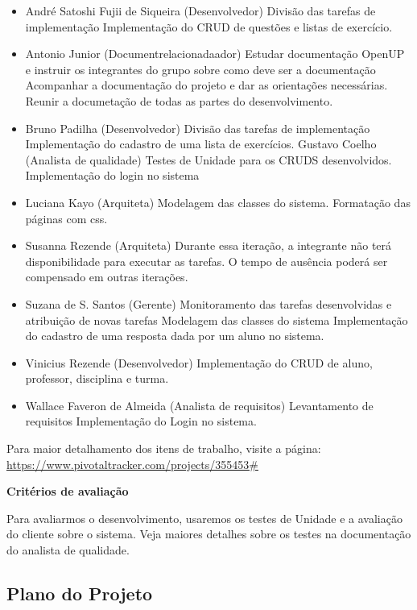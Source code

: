 \documentclass[12pt,letterpaper]{article}
\begin{document}
\begin{itemize}
\item {} André Satoshi Fujii de Siqueira (Desenvolvedor)
Divisão das tarefas de implementação
Implementação do CRUD de questões e listas de exercício.
\item {}Antonio Junior (Documentrelacionadaador)
Estudar documentação OpenUP e instruir os integrantes do grupo sobre como deve ser a documentação
Acompanhar a documentação do projeto e dar as orientações necessárias.
Reunir a documetação de todas as partes do desenvolvimento.
\item {}Bruno Padilha (Desenvolvedor)
Divisão das tarefas de implementação
Implementação do cadastro de uma lista de exercícios.
Gustavo Coelho (Analista de qualidade)
Testes de Unidade para os CRUDS desenvolvidos.
Implementação do login no sistema
\item {}Luciana Kayo (Arquiteta)
Modelagem das classes do sistema.
Formatação das páginas com css.
\item {}Susanna Rezende (Arquiteta)
Durante essa iteração, a integrante não terá disponibilidade para executar as tarefas.
O tempo de ausência poderá ser compensado em outras iterações.
\item {}Suzana de S. Santos (Gerente)
Monitoramento das tarefas desenvolvidas e atribuição de novas tarefas
Modelagem das classes do sistema
Implementação do cadastro de uma resposta dada por um aluno no sistema.
\item {}Vinicius Rezende (Desenvolvedor)
Implementação do CRUD de aluno, professor, disciplina e turma.
\item {}Wallace Faveron de Almeida (Analista de requisitos)
Levantamento de requisitos
Implementação do Login no sistema.
\end{itemize}

Para maior detalhamento dos itens de trabalho, visite a página: 
\url{https://www.pivotaltracker.com/projects/355453#}

\vspace{1cm}
{\large {\bf Critérios de avaliação}}
\vspace{0.5cm}

Para avaliarmos o desenvolvimento, usaremos os testes de Unidade e a avaliação do cliente sobre o sistema.
Veja maiores detalhes sobre os testes na documentação do analista de qualidade.


\subsection{Plano do Projeto}
\end{document}
